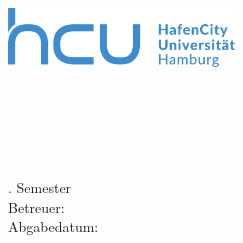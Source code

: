 \begin{titlepage}
	\thispagestyle{empty}
	
	\begin{minipage}[t]{0.4\textwidth}
		\vspace{0pt}
		\includegraphics[width=60mm]{Daten/hcu_logo.pdf}
	\end{minipage}
	\hfill
	\begin{minipage}[t]{0.5\textwidth}
		\vspace{0pt}
		\begin{flushright}
            \textbf{\underline{\Gruppenname}}\\
			\Namen
		\end{flushright}
	\end{minipage}
	
	\vfill
	
	\begin {center}
	\Large \Art
	\end {center}
	\begin {center}
	\huge \Titel
	\end {center}
	
	\vfill
	
	\begin{flushleft}
		\Veranstaltung\\
		\Semester \\
		\Studiengang\\
		\Fachsemester. Semester\\
		\vspace{10pt}
		Betreuer: \\ 
		\Betreuer
		\vspace{30pt}
		Abgabedatum: \Abgabe
	\end{flushleft}
	
\end{titlepage}